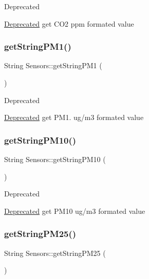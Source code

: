 \begin{DoxyRefDesc}{Deprecated}
\item[\hyperlink{deprecated__deprecated000005}{Deprecated}]get C\+O2 ppm formated value \end{DoxyRefDesc}
\mbox{\label{classSensors_a427616fc30b3d9e63ce6be5032b614c2}} 
\subsubsection{\texorpdfstring{get\+String\+P\+M1()}{getStringPM1()}}
{\footnotesize\ttfamily String Sensors\+::get\+String\+P\+M1 (\begin{DoxyParamCaption}{ }\end{DoxyParamCaption})}

\begin{DoxyRefDesc}{Deprecated}
\item[\hyperlink{deprecated__deprecated000001}{Deprecated}]get P\+M1. ug/m3 formated value \end{DoxyRefDesc}
\mbox{\label{classSensors_ab5eb58786c893bd552ef14516489c50d}} 
\subsubsection{\texorpdfstring{get\+String\+P\+M10()}{getStringPM10()}}
{\footnotesize\ttfamily String Sensors\+::get\+String\+P\+M10 (\begin{DoxyParamCaption}{ }\end{DoxyParamCaption})}

\begin{DoxyRefDesc}{Deprecated}
\item[\hyperlink{deprecated__deprecated000004}{Deprecated}]get P\+M10 ug/m3 formated value \end{DoxyRefDesc}
\mbox{\label{classSensors_ab07001101683393a4cc3609ac6449b3c}} 
\subsubsection{\texorpdfstring{get\+String\+P\+M25()}{getStringPM25()}}
{\footnotesize\ttfamily String Sensors\+::get\+String\+P\+M25 (\begin{DoxyParamCaption}{ }\end{DoxyParamCaption})}

